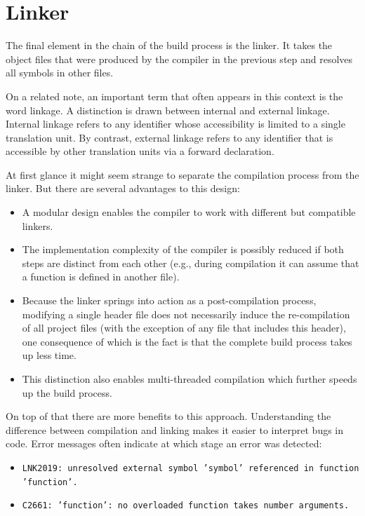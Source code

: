 \section{Linker}

The final element in the chain of the build process is the linker. It takes the
object files that were produced by the compiler in the previous step and resolves
all symbols in other files.

On a related note, an important term that often appears in this context is the word
linkage. A distinction is drawn between internal and external linkage. Internal
linkage refers to any identifier whose accessibility is limited to a single
translation unit. By contrast, external linkage refers to any identifier that is
accessible by other translation units via a forward declaration.

At first glance it might seem strange to separate the compilation process from
the linker. But there are several advantages to this design:

\begin{itemize}
    \item A modular design enables the compiler to work with different but
    compatible linkers.
    \item The implementation complexity of the compiler is possibly reduced if both
    steps are distinct from each other (e.g., during compilation it can assume that
    a function is defined in another file).
    \item Because the linker springs into action as a post-compilation process,
    modifying a single header file does not necessarily induce the re-compilation
    of all project files (with the exception of any file that includes this header),
    one consequence of which is the fact is that the complete build process takes
    up less time.
    \item This distinction also enables multi-threaded compilation which further
    speeds up the build process.
\end{itemize}

On top of that there are more benefits to this approach. Understanding the difference
between compilation and linking makes it easier to interpret bugs in code. Error
messages often indicate at which stage an error was detected:

\begin{itemize}
    \item \texttt{LNK2019: unresolved external symbol 'symbol' referenced in function 'function'.}
    \item \texttt{C2661: 'function': no overloaded function takes number arguments. }
\end{itemize}

